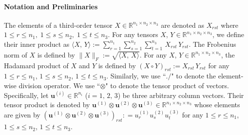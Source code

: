 \documentclass[10pt]{article}
\newcommand{\inprod}[2]{\langle #1 , #2 \rangle }
\newcommand{\R}{\mathbb R}
\newcommand{\norm}[1]{\left\lVert#1\right\rVert}
\def\inprod#1#2{\langle#1,\,#2\rangle}
\def\norm#1{\|#1\|}
\begin{document}
\paragraph{\textbf{Notation and Preliminaries}} The elements of a third-order tensor $X\in\R^{n_1\times n_2 \times n_3}$ are denoted as $X_{rst}$ where $1\leq r\leq n_1,\; 1\leq s\leq n_2,\; 1\leq t\leq n_3$. For any tensors $X$, $Y\in \R^{n_1\times n_2 \times n_3}$, we define their inner product as $\inprod{X}{Y} := {\textstyle\sum_{r = 1}^{n_1}\sum_{s = 1}^{n_2}\sum_{t=1}^{n_3}} \,X_{rst}\,Y_{rst}$. The Frobenius norm of $X$ is defined by $\norm{X}_F := \sqrt{\inprod{X}{X}}$. For any $X$, $Y\in \R^{n_1\times n_2 \times n_3}$, the Hadamard product of $X$ and $Y$ is defined by $(X\circ Y)_{rst} :=  X_{rst}\,Y_{rst}$ for any $1\leq r\leq n_1$, $1\leq s\leq n_2$, $1\leq t\leq n_3$. Similarly, we use ``$./$" to denote the element-wise division operator.
We use ``$\otimes$" to denote the tensor product of vectors. Specifically, let $\bm{u}^{(i)}\in \R^{n_i}$ ($i=1, \,2, \,3$) be three arbitrary column vectors. Their tensor product is denoted by $\bm{u}^{(1)}\otimes \bm{u}^{(2)}\otimes \bm{u}^{(3)} \in \R^{n_1\times n_2 \times n_3}$ whose elements are given by $(\bm{u}^{(1)}\otimes \bm{u}^{(2)}\otimes \bm{u}^{(3)})_{rst}: = u^{(1)}_ru^{(2)}_s u^{(3)}_t$ for any $1\leq r\leq n_1$, $1\leq s\leq n_2$, $1\leq t\leq n_3$.
\end{document}
